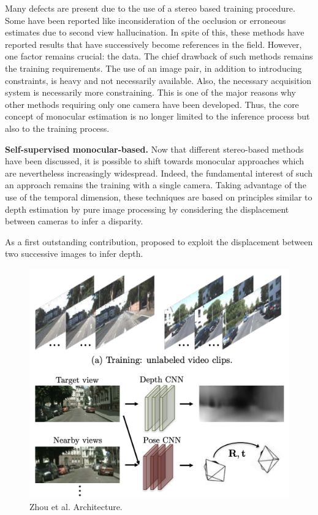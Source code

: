 Many defects are present due to the use of a stereo based training procedure. Some have been reported like inconsideration of the occlusion or erroneous estimates due to second view hallucination.
In spite of this, these methods have reported results that have successively become references in the field. However, one factor remains crucial: the data. The chief drawback of such methods remains the training requirements. The use of an image pair, in addition to introducing constraints, is heavy and not necessarily available. Also, the necessary acquisition system is necessarily more constraining.
This is one of the major reasons why other methods requiring only one camera have been developed. Thus, the core concept of monocular estimation is no longer limited to the inference process but also to the training process.

\textbf{Self-supervised monocular-based. }Now that different stereo-based methods have been discussed, it is possible to shift towards monocular approaches which are nevertheless increasingly widespread.
Indeed, the fundamental interest of such an approach remains the training with a single camera. Taking advantage of the use of the temporal dimension, these techniques are based on principles similar to depth estimation by pure image processing by considering the displacement between cameras to infer a disparity. 

As a first outstanding contribution, \cite{zhou2017unsupervised} proposed to exploit the displacement between two successive images to infer depth. 

\begin{figure}[h]
	\centering
	\includegraphics[width=0.5\linewidth]{Figures/SOA/illuzhou2017}
	\caption[Zhou et al. Architecture.]{Zhou et al.\cite{zhou2017unsupervised} Architecture.}
	\label{illuzhou2017}
\end{figure}

